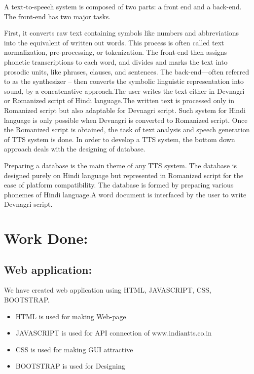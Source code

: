 \documentclass{article}
\begin{document}
\quad \large A text-to-speech system is composed of two parts: a frontend and a back-end. The front-end has two major tasks. \par
\bigskip
First, it converts raw text containing symbols like 
numbers and abbreviations into the equivalent of writtenout words. This process is often called text normalization, 
pre-processing, or tokenization. The front-end then 
assigns phonetic transcriptions to each word, and divides 
and marks the text into prosodic units, like phrases, 
clauses, and sentences. The back-end—often referred to 
as the synthesizer – then converts the symbolic linguistic 
representation into sound, by a concatenative 
approach.The user writes the text either in Devnagri or 
Romanized script of Hindi language.The written text is 
processed only in Romanized script but also adaptable for 
Devnagri script. Such system for Hindi language is only 
possible when Devnagri is converted to Romanized script. 
Once the Romanized script is obtained, the task of text 
analysis and speech generation of TTS system is done.
In order to develop a TTS system, the bottom down 
approach deals with the designing of database.\par
\bigskip
Preparing a database is the main theme of any TTS system. The 
database is designed purely on Hindi language but 
represented in Romanized script for the ease of platform 
compatibility. The database is formed by preparing 
various phonemes of Hindi language.A word document is 
interfaced by the user to write Devnagri script.


\newpage

\section{Work Done:}

\subsection{Web application:}
\large We have created web application using \cite{w3schools}HTML, JAVASCRIPT, CSS, BOOTSTRAP.
\begin{itemize}
    \item \large HTML is used for making Web-page
    \item \large JAVASCRIPT is used for API connection of www.indiantts.co.in
    \item \large CSS is used for making GUI attractive
    \item \large BOOTSTRAP is used for Designing
\end{itemize}
\end{document}
